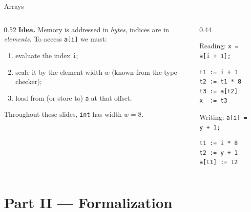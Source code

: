 \documentclass[aspectratio=169]{beamer}
\newcommand{\tc}[1]{\texttt{#1}}
\begin{document}
\begin{frame}[fragile]{Arrays}
  \begin{columns}[T]
    \begin{column}{0.52\textwidth}
      \textbf{Idea.} Memory is addressed in \emph{bytes}, indices are in
      \emph{elements}. To access \tc{a[i]} we must:
      \begin{enumerate}
        \item evaluate the index \tc{i};
        \item scale it by the element width $w$ (known from the type checker);
        \item load from (or store to) \tc{a} at that offset.
      \end{enumerate}
      Throughout these slides, \tc{int} has width $w = 8$.
    \end{column}
    \begin{column}{0.44\textwidth}
      \begin{block}{Reading: \tc{x = a[i + 1];}}
        \begin{verbatim}
t1 := i + 1
t2 := t1 * 8
t3 := a[t2]
x  := t3
        \end{verbatim}
      \end{block}
      \begin{block}{Writing: \tc{a[i] = y + 1;}}
        \begin{verbatim}
t1 := i * 8
t2 := y + 1
a[t1] := t2
        \end{verbatim}
      \end{block}
    \end{column}
  \end{columns}
\end{frame}


\section{Part II — Formalization}
\end{document}
